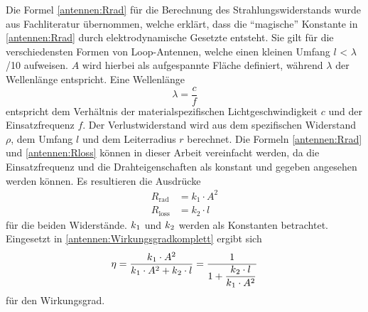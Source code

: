 Die Formel \eqref{antennen:Rrad} für die Berechnung des
Strahlungswiderstands wurde aus Fachliteratur \cite{antennen:antennaTheory}
übernommen, welche erklärt, dass die ``magische'' Konstante in
\eqref{antennen:Rrad} durch elektrodynamische Gesetzte entsteht.
Sie gilt für die verschiedensten Formen von Loop-Antennen, welche
einen kleinen Umfang  $l$ < $\lambda$/10 aufweisen. $A$ wird hierbei
als aufgespannte Fläche definiert, während $\lambda$ der Wellenlänge
entspricht. Eine Wellenlänge
\setcounter{equation}{4}
\begin{equation}
	\lambda = \frac{c}{f}
	\label{antennen:lambda}
\end{equation}
entspricht dem Verhältnis der materialspezifischen Lichtgeschwindigkeit $c$ und der Einsatzfrequenz $f$.
%
%
Der Verlustwiderstand wird aus dem spezifischen Widerstand $\rho$, dem Umfang $l$ und dem Leiterradius $r$ berechnet. Die Formeln \eqref{antennen:Rrad} und \eqref{antennen:Rloss} können in dieser Arbeit vereinfacht werden, da die Einsatzfrequenz und die Drahteigenschaften als konstant und gegeben angesehen werden können. Es resultieren die Ausdrücke 
\begin{align}
	R_{\text{rad}} &= k_{\text{1}} \cdot A^2 \tag{20.6} \label{antennen:Rrad_konst} \\
	R_{\text{loss}} &= k_{\text{2}} \cdot l \tag{20.7} \label{antennen:Rloss_konst}
\end{align}
für die beiden Widerstände. $k\textsubscript{1}$ und $k\textsubscript{2}$ werden als Konstanten betrachtet. Eingesetzt in \eqref{antennen:Wirkungsgradkomplett} ergibt sich
\setcounter{equation}{7}
\begin{equation}
\eta
=
\frac{
k\textsubscript{1}\cdot{A^2}
}{
k\textsubscript{1}\cdot{A^2}+{k\textsubscript{2}\cdot{l}}
}
=
\frac{1}{
1+\displaystyle\frac{k\textsubscript{2}\cdot{l}}{k\textsubscript{1}\cdot{A^2}}
}
	\label{antennen:Wirkungsgradeingesetzt}
\end{equation}
für den Wirkungsgrad.
